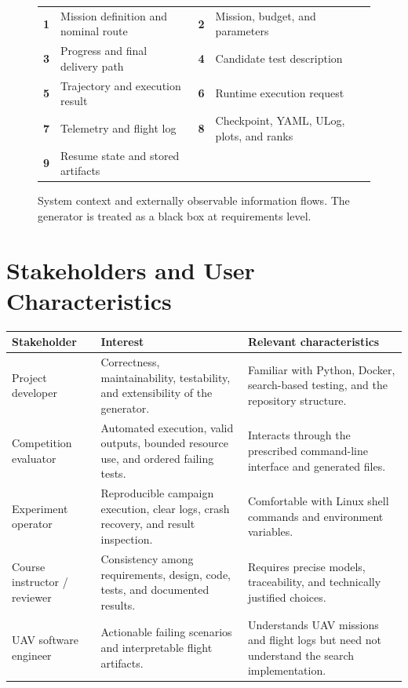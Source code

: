 \documentclass[11pt,a4paper,openany]{report}
\renewcommand{\arraystretch}{1.18}
\begin{document}
\begin{figure}[H]

\vspace{0.25em}
\begin{minipage}{0.94\textwidth}
\footnotesize
\renewcommand{\arraystretch}{1.06}
\begin{tabularx}{\textwidth}{L{0.55cm} Y L{0.55cm} Y}
\textbf{1} & Mission definition and nominal route
& \textbf{2} & Mission, budget, and parameters\\
\textbf{3} & Progress and final delivery path
& \textbf{4} & Candidate test description\\
\textbf{5} & Trajectory and execution result
& \textbf{6} & Runtime execution request\\
\textbf{7} & Telemetry and flight log
& \textbf{8} & Checkpoint, YAML, ULog, plots, and ranks\\
\textbf{9} & Resume state and stored artifacts
& & \\
\end{tabularx}
\end{minipage}
\caption{System context and externally observable information flows. The generator is treated as a black box at requirements level.}
\label{fig:context}
\end{figure}

\section{Stakeholders and User Characteristics}
\begin{table}[H]
\centering
\begin{tabularx}{\textwidth}{L{3.2cm} Y Y}
\toprule
\textbf{Stakeholder} & \textbf{Interest} & \textbf{Relevant characteristics}\\
\midrule
Project developer & Correctness, maintainability, testability, and extensibility of the generator. & Familiar with Python, Docker, search-based testing, and the repository structure.\\
Competition evaluator & Automated execution, valid outputs, bounded resource use, and ordered failing tests. & Interacts through the prescribed command-line interface and generated files.\\
Experiment operator & Reproducible campaign execution, clear logs, crash recovery, and result inspection. & Comfortable with Linux shell commands and environment variables.\\
Course instructor / reviewer & Consistency among requirements, design, code, tests, and documented results. & Requires precise models, traceability, and technically justified choices.\\
UAV software engineer & Actionable failing scenarios and interpretable flight artifacts. & Understands UAV missions and flight logs but need not understand the search implementation.\\
\bottomrule
\end{tabularx}
\end{table}
\end{document}
